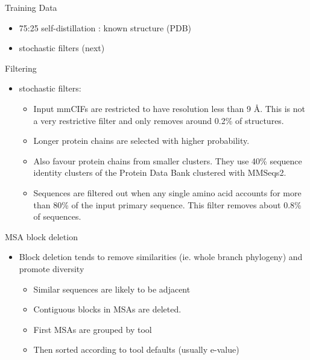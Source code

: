 \documentclass[presentation, smaller]{beamer}
\begin{document}
\begin{frame}[label={sec:org1488463}]{Training Data \cite{jumperHighlyAccurateProtein2021}}
\begin{itemize}
\item 75:25 self-distillation : known structure (PDB)
\item stochastic filters (next)
\end{itemize}
\end{frame}

\begin{frame}[label={sec:org2feed54}]{Filtering \cite{jumperHighlyAccurateProtein2021}}
\begin{itemize}
\item stochastic filters: 
\begin{itemize}
\item Input mmCIFs are restricted to have resolution less than 9 Å. This is not a very restrictive filter and only removes around 0.2\% of structures.
\item Longer protein chains are selected with higher probability.
\item Also favour protein chains from smaller clusters. They use 40\% sequence identity clusters of the Protein Data Bank clustered with MMSeqs2.
\item Sequences are filtered out when any single amino acid accounts for more than 80\% of the input primary sequence. This filter removes about 0.8\% of sequences.
\end{itemize}
\end{itemize}
\end{frame}

\begin{frame}[label={sec:org08ffa71}]{MSA block deletion \cite{jumperHighlyAccurateProtein2021}}
\begin{itemize}
\item Block deletion tends to remove similarities (ie. whole branch phylogeny) and promote diversity
\begin{itemize}
\item Similar sequences are likely to be adjacent
\item Contiguous blocks in MSAs are deleted.
\item First MSAs are grouped by tool
\item Then sorted according to tool defaults (usually e-value)
\end{itemize}
\end{itemize}
\end{frame}
\end{document}
